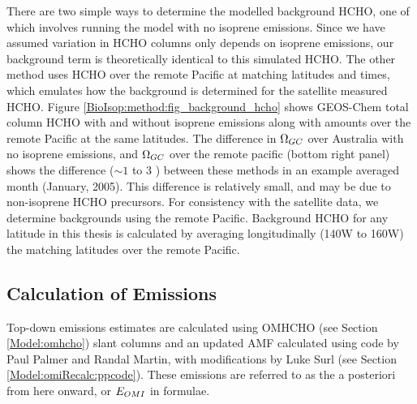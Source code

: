     There are two simple ways to determine the modelled background HCHO, one of which involves running the model with no isoprene emissions.%
    Since we have assumed variation in HCHO columns only depends on isoprene emissions, our background term is theoretically identical to this simulated HCHO.
    The other method uses HCHO over the remote Pacific at matching latitudes and times, which emulates how the background is determined for the satellite measured HCHO.
    Figure \ref{BioIsop:method:fig_background_hcho} shows GEOS-Chem total column HCHO with and without isoprene emissions along with amounts over the remote Pacific at the same latitudes.
    The difference in $\Omega_{GC}$ over Australia with no isoprene emissions, and $\Omega_{GC}$ over the remote pacific (bottom right panel) shows the difference ($\sim 1$ to $3$ \moleccm) between these methods in an example averaged month (January, 2005).
    This difference is relatively small, and may be due to non-isoprene HCHO precursors.
    For consistency with the satellite data, we determine backgrounds using the remote Pacific.
    Background HCHO for any latitude in this thesis is calculated by averaging longitudinally (140\degr W to 160\degr W) the matching latitudes over the remote Pacific.
    
    
    
  \subsection{Calculation of Emissions}
    \label{BioIsop:method:calculation}
   
    Top-down emissions estimates are calculated using OMHCHO (see Section \ref{Model:omhcho}) slant columns and an updated AMF calculated using code by Paul Palmer and Randal Martin, with modifications by Luke Surl (see Section \ref{Model:omiRecalc:ppcode}).
    These emissions are referred to as the a posteriori from here onward, or $E_{OMI}$ in formulae.
    
